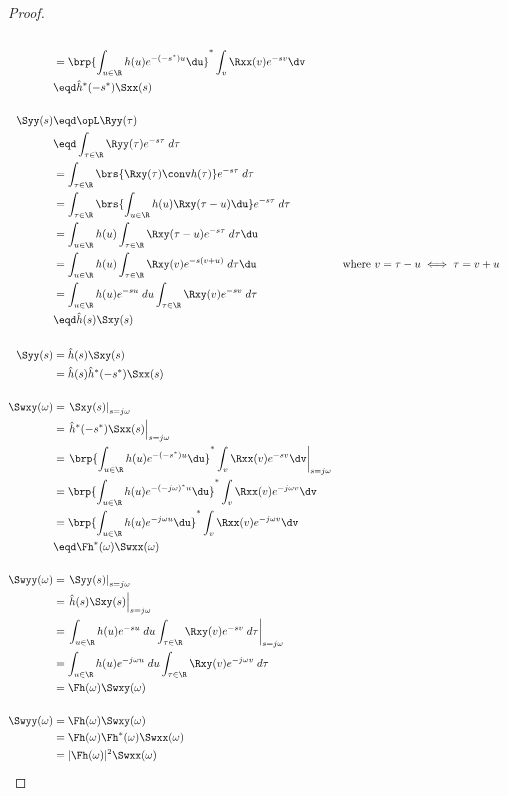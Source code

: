 \begin{proof}
\begin{align*}
   \\&=    \brp{\int_{u\in\R}h(u) e^{-(-s^\ast)u} \du }^\ast
           \int_v \Rxx(v)e^{-sv} \dv
   \\&\eqd \hat{h}^\ast(-s^\ast) \Sxx(s)
\\
\\
   \Syy(s)
     &\eqd \opL \Ryy(\tau)
   \\&\eqd \int_{\tau\in\R}\Ryy(\tau) e^{-s\tau} \; d\tau
   \\&=    \int_{\tau\in\R}\brs{ \Rxy(\tau) \conv h(\tau) } e^{-s\tau} \; d\tau
   \\&=    \int_{\tau\in\R}\brs{ \int_{u\in\R}h(u) \Rxy(\tau-u)\du } e^{-s\tau} \; d\tau
   \\&=    \int_{u\in\R}h(u) \int_{\tau\in\R}\Rxy(\tau-u) e^{-s\tau} \; d\tau\du
   \\&=    \int_{u\in\R}h(u) \int_{\tau\in\R}\Rxy(v) e^{-s(v+u)} \; d\tau\du
     && \text{where $v=\tau-u\iff \tau=v+u$}
   \\&=    \int_{u\in\R}h(u)e^{-su} \;du \int_{\tau\in\R}\Rxy(v) e^{-sv} \; d\tau
   \\&\eqd \hat{h}(s) \Sxy(s)
\\
\\
   \Syy(s)
     &= \hat{h}(s) \Sxy(s)
   \\&= \hat{h}(s) \hat{h}^\ast(-s^\ast) \Sxx(s)
\\
\\
   \Swxy(\omega)
     &=    \left.\Sxy(s)\right|_{s=j\omega}
   \\&=    \left. \hat{h}^\ast(-s^\ast) \Sxx(s)\right|_{s=j\omega}
   \\&=    \left.
           \brp{\int_{u\in\R}h(u) e^{-(-s^\ast)u} \du }^\ast
           \int_v \Rxx(v)e^{-sv} \dv
           \right|_{s=j\omega}
   \\&=    \brp{\int_{u\in\R}h(u) e^{-(-j\omega)^\ast u} \du }^\ast
           \int_v \Rxx(v)e^{-j\omega v} \dv
   \\&=    \brp{\int_{u\in\R}h(u) e^{-j\omega u} \du }^\ast
           \int_v \Rxx(v)e^{-j\omega v} \dv
   \\&\eqd \Fh^\ast(\omega) \Swxx(\omega)
\\
\\
   \Swyy(\omega)
     &=    \left.\Syy(s)\right|_{s=j\omega}
   \\&=    \left. \hat{h}(s) \Sxy(s) \right|_{s=j\omega}
   \\&=    \left. \int_{u\in\R}h(u)e^{-su} \;du \int_{\tau\in\R}\Rxy(v) e^{-sv} \; d\tau\right|_{s=j\omega}
   \\&=    \int_{u\in\R}h(u)e^{-j\omega u} \;du \int_{\tau\in\R}\Rxy(v) e^{-j\omega v} \; d\tau
   \\&=    \Fh(\omega) \Swxy(\omega)
\\
\\
  \Swyy(\omega)
     &=    \Fh(\omega)\Swxy(\omega)
   \\&=    \Fh(\omega) \Fh^\ast(\omega) \Swxx(\omega)
   \\&=    |\Fh(\omega)|^2 \Swxx(\omega)
\end{align*}
\end{proof}

